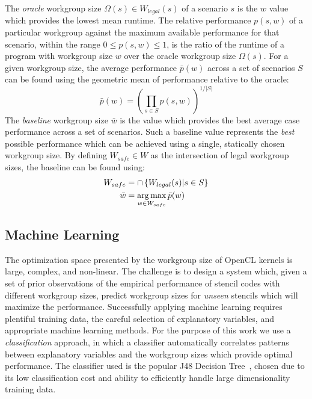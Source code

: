 \documentclass[nonatbib,preprint,nocopyrightspace,9pt]{sigplanconf}
\begin{document}
The \emph{oracle} workgroup size $\Omega(s) \in W_{legal}(s)$ of a
scenario $s$ is the $w$ value which provides the lowest mean
runtime. The relative performance $p(s,w)$ of a particular workgroup
against the maximum available performance for that scenario, within
the range $0 \le p(s,w) \le 1$, is the ratio of the runtime of a
program with workgroup size $w$ over the oracle workgroup size
$\Omega(s)$. For a given workgroup size, the average performance
$\bar{p}(w)$ across a set of scenarios $S$ can be found using the
geometric mean of performance relative to the oracle:
%
\begin{equation}
  \bar{p}(w) =
  \left(
    \prod_{s \in S} p(s, w)
  \right)^{1/|S|}
\end{equation}
%
The \emph{baseline} workgroup size $\bar{w}$ is the value which
provides the best average case performance across a set of
scenarios. Such a baseline value represents the \emph{best} possible
performance which can be achieved using a single, statically chosen
workgroup size. By defining $W_{safe} \in W$ as the intersection of
legal workgroup sizes, the baseline can be found using:
%
\begin{align}
W_{safe} &= \cap \left\{ W_{legal}(s) | s \in S \right\}\\
\bar{w} &= \operatorname*{arg\,max}_{w \in W_{safe}} \bar{p}(w)
\end{align}


\subsection{Machine Learning}

The optimization space presented by the workgroup size of OpenCL
kernels is large, complex, and non-linear. The challenge is to design
a system which, given a set of prior observations of the empirical
performance of stencil codes with different workgroup sizes, predict
workgroup sizes for \emph{unseen} stencils which will maximize the
performance. Successfully applying machine learning requires plentiful
training data, the careful selection of explanatory variables, and
appropriate machine learning methods. For the purpose of this work we
use a \emph{classification} approach, in which a classifier
automatically correlates patterns between explanatory variables and
the workgroup sizes which provide optimal performance. The classifier
used is the popular J48 Decision Tree~\cite{Han2011}, chosen due to
its low classification cost and ability to efficiently handle large
dimensionality training data.
\end{document}
